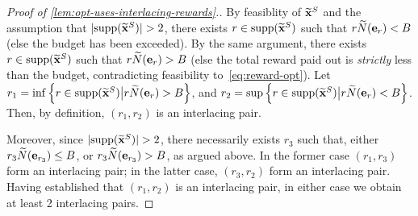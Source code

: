 \documentclass[12pt]{article}
\begin{document}
\begin{proof}[Proof of \cref{lem:opt-uses-interlacing-rewards}.]
By feasiblity of $\widetilde{\mathbf{x}}^S$ and the assumption that $|\text{supp}(\widetilde{\mathbf{x}}^S)| > 2$, there exists $r \in \text{supp}(\widetilde{\mathbf{x}}^S)$ such that $r\widetilde{N}(\mathbf{e}_{r}) < B$ (else the budget has been exceeded).  By the same argument, there exists $r \in \text{supp}(\widetilde{\mathbf{x}}^S)$ such that $r\widetilde{N}(\mathbf{e}_r) > B$ (else the total reward paid out is {\it strictly} less than the budget, contradicting feasibility to~\ref{eq:reward-opt}). Let $r_1 = \inf\left\{r \in \text{supp}(\widetilde{\mathbf{x}}^S) \big{|} r\widetilde{N}(\mathbf{e}_r) > B \right\}$, and $r_2 = \sup\left\{r \in \text{supp}(\widetilde{\mathbf{x}}^S) \big{|} r\widetilde{N}(\mathbf{e}_r) < B \right\}$. Then, by definition, $(r_1, r_2)$ is an interlacing pair.

Moreover, since $|\text{supp}(\widetilde{\mathbf{x}}^S)| > 2$, there necessarily exists $r_3$ such that, either $r_3\widetilde{N}(\mathbf{e}_{r_3}) \leq B$, or $r_3\widetilde{N}(\mathbf{e}_{r_3})> B$, as argued above. In the former case $(r_1,r_3)$ form an interlacing pair; in the latter case, $(r_3, r_2)$ form an interlacing pair. Having established that $(r_1,r_2)$ is an interlacing pair, in either case we obtain at least 2 interlacing pairs.
\end{proof}



\end{document}
